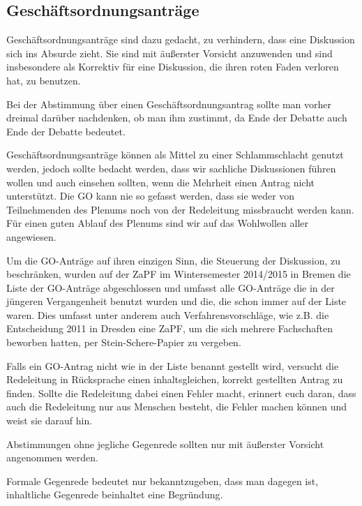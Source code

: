 \documentclass[
  a4paper,
  oneside]{scrartcl}
\begin{document}
\hypertarget{geschuxe4ftsordnungsantruxe4ge-1}{%
\subsection*{Geschäftsordnungsanträge}\label{geschuxe4ftsordnungsantruxe4ge-1}}

Geschäftsordnungsanträge sind dazu gedacht, zu verhindern, dass eine
Diskussion sich ins Absurde zieht. Sie sind mit äußerster Vorsicht
anzuwenden und sind insbesondere als Korrektiv für eine Diskussion, die
ihren roten Faden verloren hat, zu benutzen.

Bei der Abstimmung über einen Geschäftsordnungsantrag sollte man vorher
dreimal darüber nachdenken, ob man ihm zustimmt, da Ende der Debatte
auch Ende der Debatte bedeutet.

Geschäftsordnungsanträge können als Mittel zu einer Schlammschlacht
genutzt werden, jedoch sollte bedacht werden, dass wir sachliche
Diskussionen führen wollen und auch einsehen sollten, wenn die Mehrheit
einen Antrag nicht unterstützt. Die GO kann nie so gefasst werden, dass
sie weder von Teilnehmenden des Plenums noch von der Redeleitung
missbraucht werden kann. Für einen guten Ablauf des Plenums sind wir auf
das Wohlwollen aller angewiesen.

Um die GO-Anträge auf ihren einzigen Sinn, die Steuerung der Diskussion,
zu beschränken, wurden auf der ZaPF im Wintersemester 2014/2015 in
Bremen die Liste der GO-Anträge abgeschlossen und umfasst alle
GO-Anträge die in der jüngeren Vergangenheit benutzt wurden und die, die
schon immer auf der Liste waren. Dies umfasst unter anderem auch
Verfahrensvorschläge, wie z.B. die Entscheidung 2011 in Dresden eine
ZaPF, um die sich mehrere Fachschaften beworben hatten, per
Stein-Schere-Papier zu vergeben.

Falls ein GO-Antrag nicht wie in der Liste benannt gestellt wird,
versucht die Redeleitung in Rücksprache einen inhaltsgleichen, korrekt
gestellten Antrag zu finden. Sollte die Redeleitung dabei einen Fehler
macht, erinnert euch daran, dass auch die Redeleitung nur aus Menschen
besteht, die Fehler machen können und weist sie darauf hin.

Abstimmungen ohne jegliche Gegenrede sollten nur mit äußerster Vorsicht
angenommen werden.

Formale Gegenrede bedeutet nur bekanntzugeben, dass man dagegen ist,
inhaltliche Gegenrede beinhaltet eine Begründung.
\end{document}
